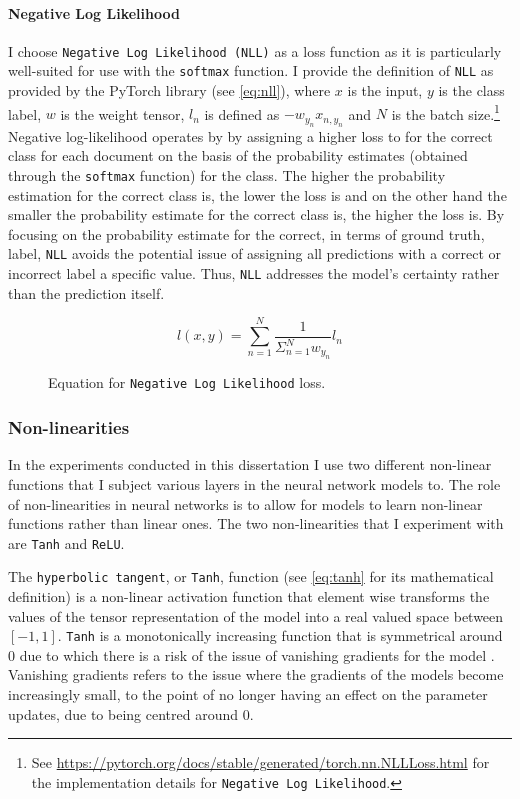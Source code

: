 \paragraph{Negative Log Likelihood} I choose \texttt{Negative Log Likelihood (NLL)} as a loss function as it is particularly well-suited for use with the \texttt{softmax} function. I provide the definition of \texttt{NLL} as provided by the PyTorch library \citep{Paszke:2019} (see \cref{eq:nll}), where $x$ is the input, $y$ is the class label, $w$ is the weight tensor, $l_n$ is defined as $-w_{y_{n}} x_{n,y_{n}}$ and $N$ is the batch size.\footnote{See \url{https://pytorch.org/docs/stable/generated/torch.nn.NLLLoss.html} for the implementation details for \texttt{Negative Log Likelihood}.}
Negative log-likelihood operates by by assigning a higher loss to for the correct class for each document on the basis of the probability estimates (obtained through the \texttt{softmax} function) for the class. The higher the probability estimation for the correct class is, the lower the loss is and on the other hand the smaller the probability estimate for the correct class is, the higher the loss is.
By focusing on the probability estimate for the correct, in terms of ground truth, label, \texttt{NLL} avoids the potential issue of assigning all predictions with a correct or incorrect label a specific value. Thus, \texttt{NLL} addresses the model's certainty rather than the prediction itself.

\begin{figure}[h]
  \begin{equation}\label{eq:nll}
    \mathit{l}(x, y) = \sum_{n=1}^{N} \dfrac{1}{\Sigma_{n=1}^{N} w_{y_{n}}}l_n
  \end{equation}
  \caption{Equation for \texttt{Negative Log Likelihood} loss.}
\end{figure}

\subsubsection{Non-linearities}

In the experiments conducted in this dissertation I use two different non-linear functions that I subject various layers in the neural network models to. The role of non-linearities in neural networks is to allow for models to learn non-linear functions rather than linear ones. The two non-linearities that I experiment with are \texttt{Tanh} and \texttt{ReLU}.

The \texttt{hyperbolic tangent}, or \texttt{Tanh}, function (see \cref{eq:tanh} for its mathematical definition) is a non-linear activation function that element wise transforms the values of the tensor representation of the model into a real valued space between $[-1, 1]$. \texttt{Tanh} is a monotonically increasing function that is symmetrical around $0$ due to which there is a risk of the issue of vanishing gradients for the model \citep{Teuwen:2020}.
Vanishing gradients refers to the issue where the gradients of the models become increasingly small, to the point of no longer having an effect on the parameter updates, due to being centred around $0$.

